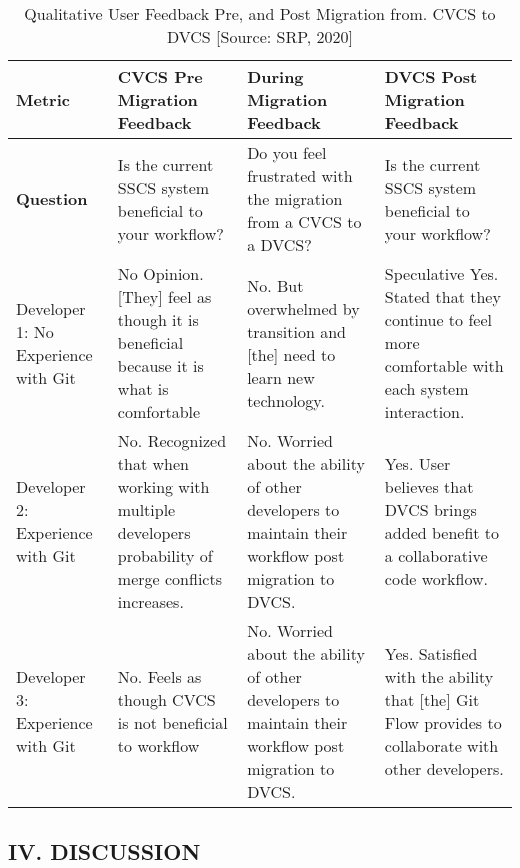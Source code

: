 \documentclass{article}
\begin{document}
\begin{table}[H]
\centering
\caption{Qualitative User Feedback Pre, and Post Migration from. CVCS to DVCS [Source:  SRP, 2020]}
\begin{tabular}{||p{3cm}|p{4cm}|p{4cm}|p{4cm}||}
\toprule
\textbf{Metric}  &
\textbf{CVCS Pre Migration Feedback}  &
\textbf{During Migration  Feedback} & 
\textbf{DVCS Post Migration Feedback}
\\
\midrule
\textbf{Question} &
Is the current SSCS system beneficial to your workflow? & Do you feel frustrated with the migration from a CVCS to a DVCS? & 
Is the current SSCS system beneficial to your workflow? \\
\midrule
Developer 1: No Experience with Git & No Opinion. [They] feel as though it is beneficial because it is what is comfortable  & No. But overwhelmed by transition and [the] need to learn new technology. & Speculative Yes. Stated that they continue to feel more comfortable with each system interaction.\\ \midrule
\midrule
Developer 2:  Experience with Git  & No. Recognized that when working with multiple developers probability of merge conflicts increases. & No. Worried about the ability of other developers to maintain their workflow post migration to DVCS. & Yes. User believes that DVCS brings added benefit to a collaborative code workflow.  \\ \midrule
Developer 3:  Experience with Git & No. Feels as though  CVCS is not beneficial to workflow & No. Worried about the ability of other developers to maintain their workflow post migration to DVCS. & Yes. Satisfied with the ability that [the] Git Flow provides to collaborate with other developers.  \\ \bottomrule
\end{tabular}
\end{table}
\begin{center}
    \section*{IV. DISCUSSION}
\end{center}
\justifying
\end{document}
